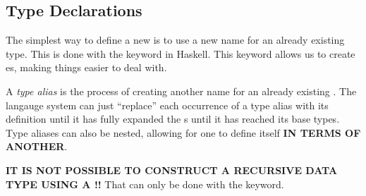 \subsection{Type Declarations}\label{subsec:Type_Declarations}
The simplest way to define a new  is to use a new name for an already existing type.
This is done with the  keyword in Haskell.
This keyword allows us to create es, making things easier to deal with.

\begin{definition}\label{def:Type_Alias}
  A \emph{type alias} is the process of creating another name for an already existing .
  The langauge system can just ``replace'' each occurrence of a type alias with its definition until it has fully expanded the s until it has reached its base types.
  Type aliases can also be nested, allowing for one to define itself \textbf{IN TERMS OF ANOTHER}.

  \begin{remark}\label{rmk:Recursive_Type_Alias}
    \textbf{IT IS NOT POSSIBLE TO CONSTRUCT A RECURSIVE DATA TYPE USING A !!}
    That can only be done with the  keyword.
  \end{remark}
\end{definition}


